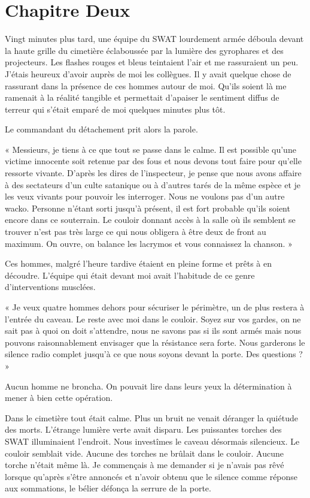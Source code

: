 \chapter[Chapitre Deux]{Chapitre Deux}
Vingt minutes plus tard, une équipe du SWAT lourdement armée déboula devant la haute grille du cimetière éclaboussée 
par la lumière des gyrophares et des projecteurs. Les flashes rouges et bleus teintaient l'air et me rassuraient un peu. 
J'étais heureux d'avoir auprès de moi les collègues. Il y avait quelque chose de rassurant dans la présence de ces hommes 
autour de moi. Qu'ils soient là me ramenait à la réalité tangible et permettait d'apaiser le sentiment diffus de terreur 
qui s'était emparé de moi quelques minutes plus tôt.

Le commandant du détachement prit alors la parole.

« Messieurs, je tiens à ce que tout se passe dans le calme. Il est possible qu'une victime innocente soit retenue par 
des fous et nous devons tout faire pour qu'elle ressorte vivante. D'après les dires de l'inspecteur, je pense que nous 
avons affaire à des sectateurs d'un culte satanique ou à d'autres tarés de la même espèce et je les veux vivants pour 
pouvoir les interroger. Nous ne voulons pas d'un autre wacko. Personne n'étant sorti jusqu'à présent, il est fort 
probable qu'ils soient encore dans ce souterrain. Le couloir donnant accès à la salle où ils semblent se trouver n'est 
pas très large ce qui nous obligera à être deux de front au maximum. On ouvre, on balance les lacrymos et vous connaissez 
la chanson. »  

Ces hommes, malgré l'heure tardive étaient en pleine forme et prêts à en découdre. L'équipe qui était devant moi avait 
l'habitude de ce genre d'interventions musclées.

« Je veux quatre hommes dehors pour sécuriser le périmètre, un de plus restera à l'entrée du caveau. Le reste avec moi 
dans le couloir. Soyez sur vos gardes, on ne sait pas à quoi on doit s'attendre, nous ne savons pas si ils sont armés 
mais nous pouvons raisonnablement envisager que la résistance sera forte. Nous garderons le silence radio complet 
jusqu'à ce que nous soyons devant la porte. Des questions ? »

Aucun homme ne broncha. On pouvait lire dans leurs yeux la détermination à mener à bien cette opération.

Dans le cimetière tout était calme. Plus un bruit ne venait déranger la quiétude des morts. L'étrange lumière verte 
avait disparu. Les puissantes torches des SWAT illuminaient l'endroit. Nous investîmes le caveau désormais silencieux. 
Le couloir semblait vide. Aucune des torches ne brûlait dans le couloir. Aucune torche n'était même là. Je commençais 
à me demander si je n'avais pas rêvé lorsque qu'après s'être annoncés et n'avoir obtenu que le silence comme réponse 
aux sommations, le bélier défonça la serrure de la porte.


